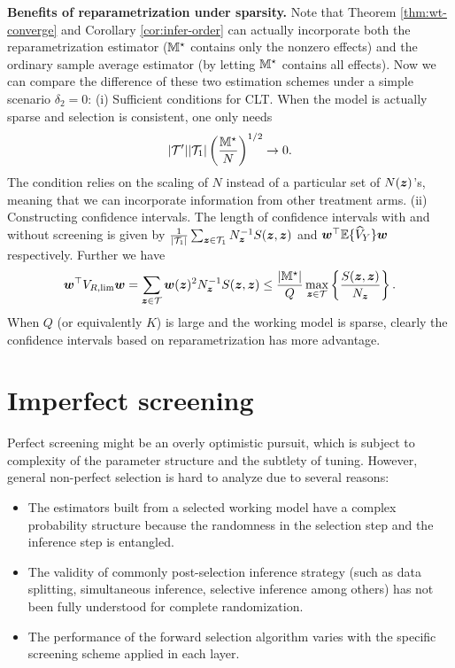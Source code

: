 \documentclass[12pt]{article}
\begin{document}
\textbf{Benefits of reparametrization under sparsity.}  Note that Theorem \ref{thm:wt-converge} and Corollary \ref{cor:infer-order} can actually incorporate both the reparametrization estimator (${\mathbb{M}}^\star$ contains only the nonzero effects) and the ordinary sample average estimator (by letting ${\mathbb{M}}^\star $ contains all effects). Now we can compare the difference of these two estimation schemes under a simple scenario $\delta_2 = 0$: (i) Sufficient conditions for CLT. When the model is actually sparse and selection is consistent, one only needs
\begin{align*}
|{\mathcal{T}}'||{\mathcal{T}}_1|\left(\frac{{\mathbb{M}}^\star}{N}\right)^{1/2} \to 0.
\end{align*}
The condition relies on the scaling of $N$ instead of a particular set of $N({\boldsymbol{z}})$'s, meaning that we can incorporate information from other treatment arms. (ii) Constructing confidence intervals. The length of confidence intervals with and without  screening is given by $\frac{1}{|{\mathcal{T}}_1|}\sum_{{\boldsymbol{z}}\in{\mathcal{T}}_1}N_{\boldsymbol{z}}^{-1} {S}({\boldsymbol{z}},{\boldsymbol{z}})$ and ${\boldsymbol{w}}^\top  {\mathbb{E}}\{\widehat{V}_Y\} {\boldsymbol{w}}$ respectively. Further we have
\begin{align*}
    {\boldsymbol{w}}^\top V_{R,\lim}{\boldsymbol{w}}  
     = \sum_{{\boldsymbol{z}}\in{\mathcal{T}}} {\boldsymbol{w}}({\boldsymbol{z}})^2N_{\boldsymbol{z}}^{-1}S({\boldsymbol{z}},{\boldsymbol{z}})
     \le  \frac{|{\mathbb{M}}^\star|}{Q} \max_{{\boldsymbol{z}}\in{\mathcal{T}}}\left\{\frac{S({\boldsymbol{z}},{\boldsymbol{z}})}{N_{{\boldsymbol{z}}}}\right\}.
\end{align*}
When $Q$ (or equivalently $K$) is large and the working model is sparse, clearly the confidence intervals based on reparametrization has more advantage. 







\section{Imperfect  screening}

Perfect  screening might be an overly optimistic pursuit, which is subject to complexity of the parameter structure and the subtlety of tuning. However, general non-perfect selection is hard to analyze due to several reasons:
\begin{itemize}
    \item The estimators built from a selected working model have a complex probability structure because the randomness in the selection step and the inference step is entangled.
    \item The validity of commonly post-selection inference strategy (such as data splitting, simultaneous inference, selective inference among others) has not been fully understood for complete randomization. 
    \item The performance of the forward selection algorithm varies with the specific  screening scheme applied in each layer.
\end{itemize}
\end{document}
